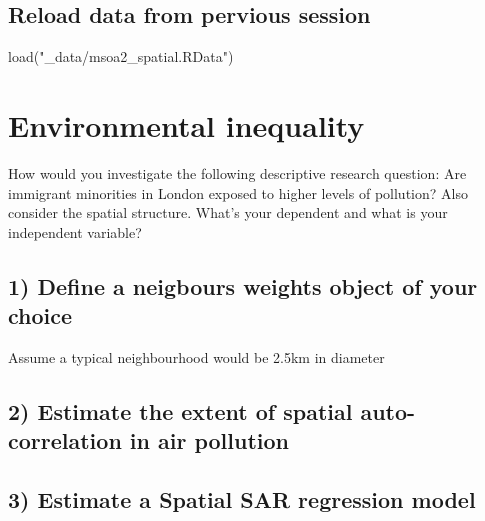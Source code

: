\documentclass[
  letterpaper,
  DIV=11,
  numbers=noendperiod]{scrreprt}
\newenvironment{Shaded}{\begin{snugshade}}{\end{snugshade}}
\newcommand{\FunctionTok}[1]{\textcolor[rgb]{0.28,0.35,0.67}{#1}}
\newcommand{\NormalTok}[1]{\textcolor[rgb]{0.00,0.23,0.31}{#1}}
\newcommand{\StringTok}[1]{\textcolor[rgb]{0.13,0.47,0.30}{#1}}
\begin{document}
\hypertarget{reload-data-from-pervious-session-6}{%
\subsection*{Reload data from pervious
session}\label{reload-data-from-pervious-session-6}}

\begin{Shaded}
\begin{Highlighting}[]
\FunctionTok{load}\NormalTok{(}\StringTok{"\_data/msoa2\_spatial.RData"}\NormalTok{)}
\end{Highlighting}
\end{Shaded}

\hypertarget{environmental-inequality}{%
\section{Environmental inequality}\label{environmental-inequality}}

How would you investigate the following descriptive research question:
Are immigrant minorities in London exposed to higher levels of
pollution? Also consider the spatial structure. What's your dependent
and what is your independent variable?

\hypertarget{define-a-neigbours-weights-object-of-your-choice}{%
\subsection*{1) Define a neigbours weights object of your
choice}\label{define-a-neigbours-weights-object-of-your-choice}}

Assume a typical neighbourhood would be 2.5km in diameter

\hypertarget{estimate-the-extent-of-spatial-auto-correlation-in-air-pollution}{%
\subsection*{2) Estimate the extent of spatial auto-correlation in air
pollution}\label{estimate-the-extent-of-spatial-auto-correlation-in-air-pollution}}

\hypertarget{estimate-a-spatial-sar-regression-model}{%
\subsection*{3) Estimate a Spatial SAR regression
model}\label{estimate-a-spatial-sar-regression-model}}
\end{document}
